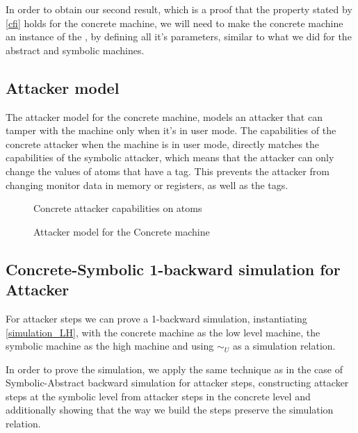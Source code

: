 In order to obtain our second result, which is a proof that the
property stated by \cref{cfi} holds for the concrete machine, we will
need to make the concrete machine an instance of
the , by defining all it's parameters, similar
to what we did for the abstract and symbolic machines.

\subsection{Attacker model}\label{sec:concrete_attacker}

The attacker model for the concrete machine, models an attacker that
can tamper with the machine only when it's in user mode. The
capabilities of the concrete attacker when the machine is in user
mode, directly matches the capabilities of the symbolic attacker,
which means that the attacker can only change the values of atoms that
have a \USERname tag. This prevents the attacker from changing monitor
data in memory or registers, as well as the tags.

\begin{figure}[htb!]
\caption{Concrete attacker capabilities on atoms}
\label{concrete_attacker_atom}
\end{figure}

\begin{figure}[htb!]
\caption{Attacker model for the Concrete machine}
\label{concrete_attacker}
\end{figure}

\subsection{Concrete-Symbolic 1-backward simulation for Attacker}
\label{sec:backward_CS_attacker}

For attacker steps we can prove a 1-backward simulation, instantiating
\cref{simulation_LH}, with the concrete machine as the low level machine,
the symbolic machine as the high machine and using $\sim_U$ as a simulation
relation.

In order to prove the simulation, we apply the same technique as in the
case of Symbolic-Abstract backward simulation for attacker steps, constructing
attacker steps at the symbolic level from attacker steps in the concrete level
and additionally showing that the way we build the steps preserve the simulation
relation.

